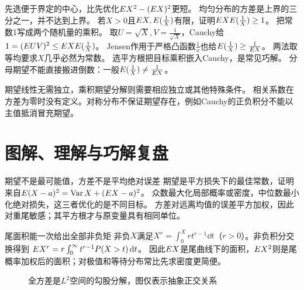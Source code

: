 {先选便于界定的中心，比先优化$E X^2-(E X)^2$更短。}
{均匀分布的方差是上界的三分之一，并不达到上界。}
{若$X>0$且$E X,E(\frac{1}{X})$有限，证明$E XE(\frac{1}{X})\ge1$。}
{把常数1写成两个随机量的乘积。}
{取$U=\sqrt X,V=\frac{1}{\sqrt X}$，Cauchy给
$1=(E UV)^2\le E XE(\frac{1}{X})$。
Jensen作用于严格凸函数$\frac{1}{x}$也给$E(\frac{1}{X})\ge\frac{1}{E X}$。
两法取等均要求$X$几乎必然为常数。}
{选平方根把目标乘积嵌入Cauchy，是常见巧解。}
{分母期望不能直接搬进倒数：一般$E(\frac{1}{X})\ne\frac{1}{E X}$。}
\begin{warning}
期望线性无需独立，乘积期望分解则需要相应独立或其他特殊条件。
相关系数在方差为零时没有定义。对称分布不保证期望存在，例如Cauchy的正负积分不能以主值抵消冒充期望。
\end{warning}

\section*{图解、理解与巧解复盘}
\begin{insight}{期望不是最可能值，方差不是平均绝对误差}
期望是平方损失下的最佳常数，证明来自$E(X-a)^2=\operatorname{Var} X+(E X-a)^2$。
众数最大化局部概率或密度，中位数最小化绝对损失，这三者优化的是不同目标。
方差对远离均值的误差平方加权，因此对重尾敏感；其平方根才与原变量具有相同单位。
\end{insight}
\begin{clevertrick}{尾面积能一次给出全部非负矩}
非负$X$满足$X^r=\int_0^Xrt^{r-1}\dd t$（$r>0$）。非负积分交换得到
$E X^r=r\int_0^\infty t^{r-1}P(X>t)\,\mathrm d t$。
因此$E X$是尾曲线下的面积，$E X^2$则是尾概率加权后的面积；对极值和等待分布常比先求密度更简便。
\end{clevertrick}
\begin{figure}[htbp]\centering
{}\caption{全方差是$L^2$空间的勾股分解，图仅表示抽象正交关系}\label{fig:conditional-projection}\end{figure}

